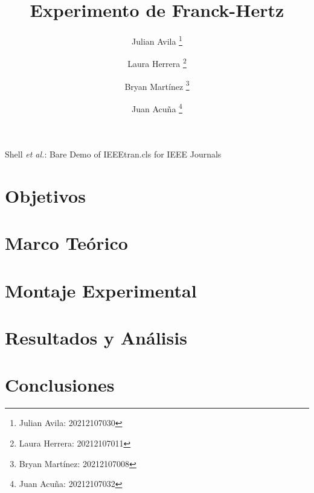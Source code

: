 \documentclass[journal, table]{IEEEtran}
\begin{document}
\title{Experimento de Franck-Hertz}

\author[*]{Julian Avila
  \thanks{Julian Avila: 20212107030}}
\author[*]{Laura Herrera
  \thanks{Laura Herrera: 20212107011}}
\author[*]{Bryan Martínez
  \thanks{Bryan Martínez: 20212107008}}
\author[*]{Juan Acuña
  \thanks{Juan Acuña: 20212107032}}


\markboth{}
{Shell \MakeLowercase{\textit{et al.}}: Bare Demo of IEEEtran.cls for IEEE Journals}

\maketitle



\section{Objetivos}


\section{Marco Teórico}


\section{Montaje Experimental}


\section{Resultados y Análisis}


\section{Conclusiones}


\printbibliography
\end{document}
